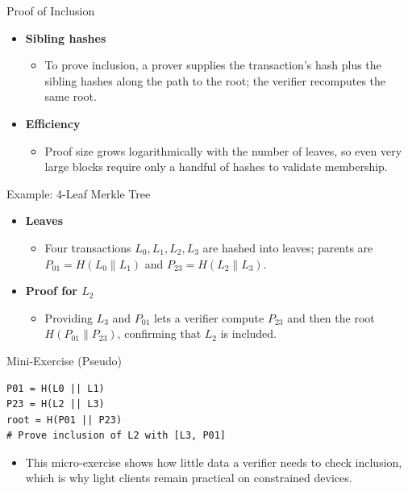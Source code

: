 \documentclass[aspectratio=169]{beamer}
\begin{document}
\begin{frame}{Proof of Inclusion}
  \begin{itemize}
    \item \textbf{Sibling hashes}
      \begin{itemize}
        \item To prove inclusion, a prover supplies the transaction’s hash plus the sibling hashes along the path to the root; the verifier recomputes the same root.
      \end{itemize}
    \item \textbf{Efficiency}
      \begin{itemize}
        \item Proof size grows logarithmically with the number of leaves, so even very large blocks require only a handful of hashes to validate membership.
      \end{itemize}
  \end{itemize}
\end{frame}

\begin{frame}{Example: 4-Leaf Merkle Tree}
  \begin{itemize}
    \item \textbf{Leaves}
      \begin{itemize}
        \item Four transactions $L_0, L_1, L_2, L_3$ are hashed into leaves; parents are $P_{01} = H(L_0 \| L_1)$ and $P_{23} = H(L_2 \| L_3)$.
      \end{itemize}
    \item \textbf{Proof for $L_2$}
      \begin{itemize}
        \item Providing $L_3$ and $P_{01}$ lets a verifier compute $P_{23}$ and then the root $H(P_{01} \| P_{23})$, confirming that $L_2$ is included.
      \end{itemize}
  \end{itemize}
\end{frame}

\begin{frame}[fragile]{Mini-Exercise (Pseudo)}
\begin{lstlisting}
P01 = H(L0 || L1)
P23 = H(L2 || L3)
root = H(P01 || P23)
# Prove inclusion of L2 with [L3, P01]
\end{lstlisting}
  \begin{itemize}
    \item This micro-exercise shows how little data a verifier needs to check inclusion, which is why light clients remain practical on constrained devices.
  \end{itemize}
\end{frame}
\end{document}
